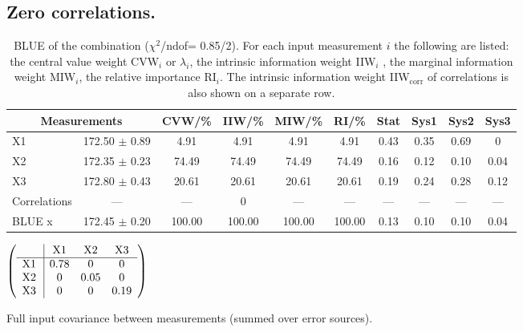 \subsection{Zero correlations.}
\begin{table}[H]
\scriptsize
\begin{center}
\renewcommand{\arraystretch}{1.1}
\begin{tabular}{|lc|c|c|c|c|cccc|}
\hline
\multicolumn{2}{|c|}{Measurements} & CVW/\%  & IIW/\%  & MIW/\%  & RI/\%  & {\tiny Stat} & {\tiny Sys1} & {\tiny Sys2} & {\tiny Sys3}\\
\hline
X1 &     172.50 $\pm$       0.89 &       4.91 &       4.91 &       4.91 &       4.91 &       0.43 &       0.35 &       0.69 &  0\\
X2 &     172.35 $\pm$       0.23 &      74.49 &      74.49 &      74.49 &      74.49 &       0.16 &       0.12 &       0.10 &       0.04\\
X3 &     172.80 $\pm$       0.43 &      20.61 &      20.61 &      20.61 &      20.61 &       0.19 &       0.24 &       0.28 &       0.12\\
Correlations & --- & --- &  0 & --- & --- & --- & --- & --- & ---\\
\hline
BLUE {\tiny x} &     172.45 $\pm$       0.20 &     100.00 &     100.00 &     100.00 &     100.00 &       0.13 &       0.10 &       0.10 &       0.04\\
\hline
\end{tabular}
\caption{BLUE of the combination ($\chi^2$/ndof=      0.85/2).
 For each input measurement $i$ the following are listed: the central value weight CVW$_i$ or $\lambda_i$, the intrinsic information weight IIW$_i$ , the marginal information weight MIW$_i$, the relative importance RI$_i$. The intrinsic information weight IIW$_{\mathrm{corr}}$ of correlations is also shown on a separate row.}
\renewcommand{\arraystretch}{1}
\end{center}
\end{table}
\begin{table}[H]
\scriptsize
\begin{center}
\renewcommand{\arraystretch}{1.1}
\begin{math}\left(\begin{array}{c|ccc}
 & \mathrm{X1} & 
\mathrm{X2} & 
\mathrm{X3} \\
\hline
\mathrm{X1} \hspace*{2pt} &       0.78 &  0 &  0 \\
\mathrm{X2} \hspace*{2pt} &  0 &       0.05 &  0 \\
\mathrm{X3} \hspace*{2pt} &  0 &  0 &       0.19 \\
\end{array}\right)\end{math}
\caption{Full input covariance between measurements (summed over error sources).}
\renewcommand{\arraystretch}{1}
\end{center}
\end{table}

